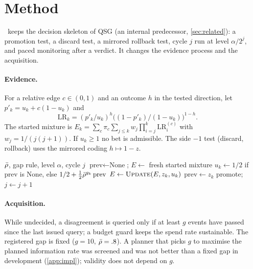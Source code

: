 \section{Method}\label{sec:method}

\NAD\ keeps the decision skeleton of QSG (an internal predecessor, \cref{sec:related}): a promotion
test, a discard test, a mirrored rollback test, cycle $j$ run at level $\alpha/2^j$, and paced
monitoring after a verdict. It changes the evidence process and the acquisition.

\paragraph{Evidence.} For a relative edge $c\in(0,1)$ and an outcome $h$ in the tested direction, let
$p'_k=u_k+c(1-u_k)$ and
\[
\mathrm{LR}_k=(p'_k/u_k)^{h}\big((1-p'_k)/(1-u_k)\big)^{1-h}.
\]
The started mixture is $E_k=\sum_c\pi_c\sum_{j\le k}w_j\prod_{i=j}^{k}\mathrm{LR}_i^{(c)}$ with
$w_j=1/(j(j+1))$. If $u_k\ge1$ no bet is admissible. The side $-1$ test (discard, rollback) uses the
mirrored coding $h\mapsto 1-z$.

\begin{algorithm}[tb]
\caption{\NAD\ envelope certificate (side $+1$)}\label{alg:nad}
\begin{algorithmic}
 $\bar\rho$, gap rule, level $\alpha$, cycle $j$
\STATE $\text{prev}\gets\text{None}$; $E\gets$ fresh started mixture
  \STATE $u_k\gets 1/2$ if prev is None, else $1/2+\tfrac12\bar\rho^{g_k}\,\text{prev}$
     \STATE $E\gets \textsc{Update}(E,z_k,u_k)$
  \ENDIF
  \STATE $\text{prev}\gets z_k$ 
   \STATE promote; $j\gets j+1$ \ENDIF
\ENDFOR
\end{algorithmic}
\end{algorithm}

\paragraph{Acquisition.} While undecided, a disagreement is queried only if at least $g$ events have
passed since the last issued query; a budget guard keeps the spend rate sustainable. The registered
gap is fixed ($g=10$, $\bar\rho=.8$). A planner that picks $g$ to maximise the planned information rate
was screened and was not better than a fixed gap in development (\cref{app:impl}); validity does not
depend on $g$.


